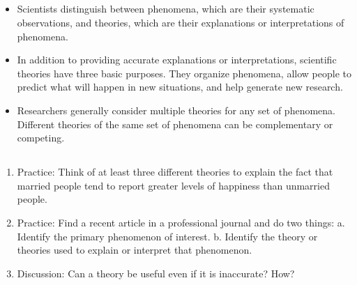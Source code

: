 \subsection{}


\begin{itemize}


\item Scientists distinguish between phenomena, which are their systematic observations, and theories, which are their explanations or interpretations of phenomena.



\item In addition to providing accurate explanations or interpretations, scientific theories have three basic purposes. They organize phenomena, allow people to predict what will happen in new situations, and help generate new research.



\item Researchers generally consider multiple theories for any set of phenomena. Different theories of the same set of phenomena can be complementary or competing.


\end{itemize}




\subsection{}


\begin{fullwidth}


\begin{enumerate}


\item Practice: Think of at least three different theories to explain the fact that married people tend to report greater levels of happiness than unmarried people.



\item Practice: Find a recent article in a professional journal and do two things:
a. Identify the primary phenomenon of interest.
b. Identify the theory or theories used to explain or interpret that phenomenon. 



\item Discussion: Can a theory be useful even if it is inaccurate? How?
    


\end{enumerate}


\end{fullwidth}  

